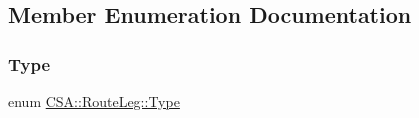 \subsection{Member Enumeration Documentation}
\mbox{\label{classCSA_1_1RouteLeg_a464547cf160a77a2014d101560b1f77b}} 
\subsubsection{\texorpdfstring{Type}{Type}}
{\footnotesize\ttfamily enum \mbox{\hyperlink{classCSA_1_1RouteLeg_a464547cf160a77a2014d101560b1f77b}{C\+S\+A\+::\+Route\+Leg\+::\+Type}}\hspace{0.3cm}{\ttfamily [strong]}}

